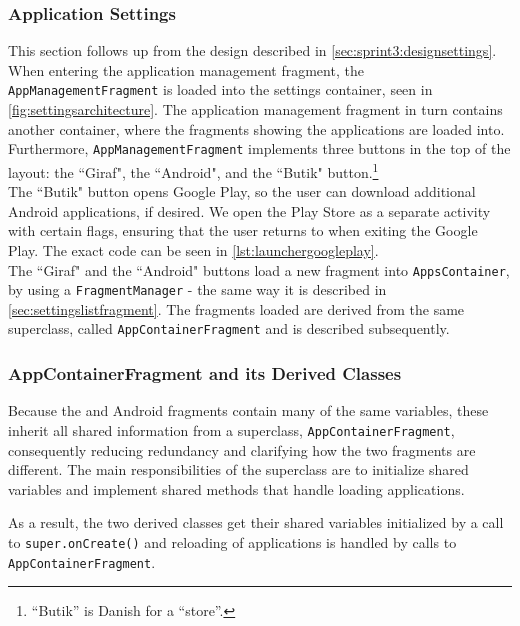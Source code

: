 \subsubsection{Application Settings}
This section follows up from the design described in \cref{sec:sprint3:designsettings}.
When entering the application management fragment, the \lstinline!AppManagementFragment! is loaded into the settings container, seen in \cref{fig:settingsarchitecture}.
The application management fragment in turn contains another container, where the fragments showing the applications are loaded into.
Furthermore, \lstinline!AppManagementFragment! implements three buttons in the top of the layout: the ``Giraf", the ``Android", and the ``Butik" button.\footnote{``Butik'' is Danish for a ``store''.}\\

The ``Butik" button opens Google Play, so the user can download additional Android applications, if desired. 
We open the Play Store as a separate activity with certain flags, ensuring that the user returns to \launcher when exiting the Google Play.
The exact code can be seen in \cref{lst:launchergoogleplay}.\\

The ``Giraf" and the ``Android" buttons load a new fragment into  \lstinline!AppsContainer!, by using a \lstinline!FragmentManager! - the same way it is described in \cref{sec:settingslistfragment}.
The fragments loaded are derived from the same superclass, called \lstinline|AppContainerFragment| and is described subsequently.

\subsubsection{AppContainerFragment and its Derived Classes}

Because the \giraf and Android fragments contain many of the same variables, these inherit all shared information from a superclass, \lstinline!AppContainerFragment!, consequently reducing redundancy and clarifying how the two fragments are different.
The main responsibilities of the superclass are to initialize shared variables and implement shared methods that handle loading applications.

As a result, the two derived classes get their shared variables initialized by a call to \lstinline!super.onCreate()! and reloading of applications is handled by calls to \lstinline!AppContainerFragment!. \\

